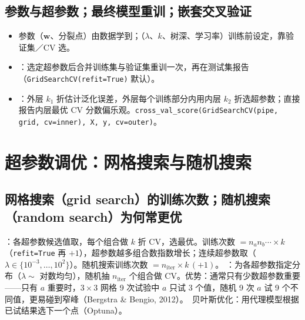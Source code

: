 \subsection{参数与超参数；最终模型重训；嵌套交叉验证}
\begin{itemize}
\item 参数（$\bm w$、分裂点）由数据学到；（$\lambda$、$k$、树深、学习率）训练前设定，靠验证集／CV 选。
\item {}：选定超参数后合并训练集与验证集重训一次，再在测试集报告（\texttt{GridSearchCV(refit=True)} 默认）。
\item {}：外层 $k_1$ 折估计泛化误差，外层每个训练部分内用内层 $k_2$ 折选超参数；直接报告内层最优 CV 分数偏乐观。\texttt{cross\_val\_score(GridSearchCV(pipe, grid, cv=inner), X, y, cv=outer)}。
\end{itemize}

\section{超参数调优：网格搜索与随机搜索}

\subsection{网格搜索（grid search）的训练次数；随机搜索（random search）为何常更优}
：各超参数候选值取，每个组合做 $k$ 折 CV，选最优。训练次数 $=n_a n_b\cdots\times k$（\texttt{refit=True} 再 $+1$），超参数越多组合数指数增长；连续超参数取（$\lambda\in\{10^{-3},\dots,10^2\}$）。随机搜索训练次数 $=n_{\text{iter}}\times k\,(+1)$。
：为各超参数指定分布（$\lambda\sim$ 对数均匀），随机抽 $n_{\text{iter}}$ 个组合做 CV。优势：通常只有少数超参数重要——只有 $a$ 重要时，$3\times3$ 网格 9 次试验中 $a$ 只试 3 个值，随机 9 次 $a$ 试 9 个不同值，更易碰到窄峰（Bergstra \& Bengio, 2012）。\tagext\ 贝叶斯优化：用代理模型根据已试结果选下一个点（Optuna）。

